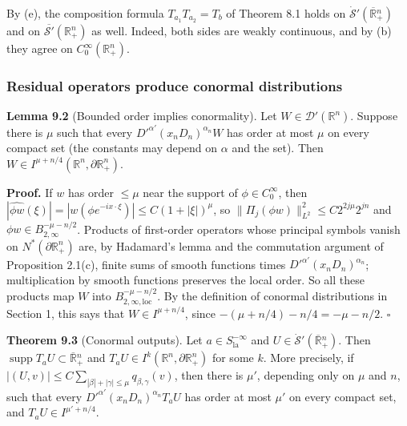 \documentclass[
  11pt,
]{article}
\begin{document}
By (e), the composition formula \(T_{a_1}T_{a_2}=T_b\) of Theorem 8.1
holds on \(\dot{\mathcal S}'(\overline{\mathbb R}{}^n_+)\) and on
\(\overline{\mathcal S'}(\mathbb R^n_+)\) as well. Indeed, both sides
are weakly continuous, and by (b) they agree on
\(C_0^\infty(\mathbb R^n_+)\).

\subsubsection{Residual operators produce conormal
distributions}\label{residual-operators-produce-conormal-distributions}

\textbf{Lemma 9.2} (Bounded order implies conormality). Let
\(W\in\mathcal D'(\mathbb R^n)\). Suppose there is \(\mu\) such that
every \(D'^{\alpha'}(x_nD_n)^{\alpha_n}W\) has order at most \(\mu\) on
every compact set (the constants may depend on \(\alpha\) and the set).
Then \(W\in I^{\mu+n/4}(\mathbb R^n,\partial\mathbb R^n_+)\).

\textbf{Proof.} If \(w\) has order \(\leq\mu\) near the support of
\(\phi\in C_0^\infty\), then
\(|\widehat{\phi w}(\xi)|=|w(\phi e^{-ix\cdot\xi})|\leq C(1+|\xi|)^\mu\),
so \(\|\Pi_j(\phi w)\|_{L^2}^2\leq C2^{2j\mu}2^{jn}\) and
\(\phi w\in B^{-\mu-n/2}_{2,\infty}\). Products of first-order operators
whose principal symbols vanish on \(N^*(\partial\mathbb R^n_+)\) are, by
Hadamard's lemma and the commutation argument of Proposition 2.1(c),
finite sums of smooth functions times
\(D'^{\alpha'}(x_nD_n)^{\alpha_n}\); multiplication by smooth functions
preserves the local order. So all these products map \(W\) into
\(B^{-\mu-n/2}_{2,\infty,\mathrm{loc}}\). By the definition of conormal
distributions in Section 1, this says that \(W\in I^{\mu+n/4}\), since
\(-(\mu+n/4)-n/4=-\mu-n/2\). \(\square\)

\textbf{Theorem 9.3} (Conormal outputs). Let
\(a\in S^{-\infty}_{\mathrm{la}}\) and
\(U\in\dot{\mathcal S}'(\overline{\mathbb R}{}^n_+)\). Then
\(\operatorname{supp}T_aU\subset\overline{\mathbb R}{}^n_+\) and
\(T_aU\in I^k(\mathbb R^n,\partial\mathbb R^n_+)\) for some \(k\). More
precisely, if
\(|(U,v)|\leq C\sum_{|\beta|+|\gamma|\leq\mu}q_{\beta,\gamma}(v)\), then
there is \(\mu'\), depending only on \(\mu\) and \(n\), such that every
\(D'^{\alpha'}(x_nD_n)^{\alpha_n}T_aU\) has order at most \(\mu'\) on
every compact set, and \(T_aU\in I^{\mu'+n/4}\).
\end{document}
